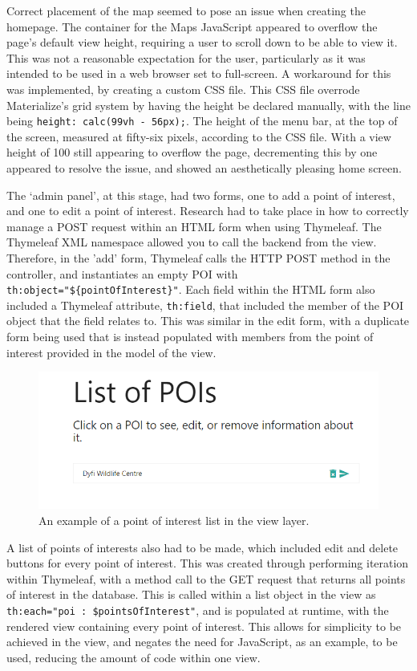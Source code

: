 Correct placement of the map seemed to pose an issue when creating the homepage. The container for the Maps JavaScript appeared to overflow the page's default view height, requiring a user to scroll down to be able to view it. This was not a reasonable expectation for the user, particularly as it was intended to be used in a web browser set to full-screen. A workaround for this was implemented, by creating a custom CSS file. This CSS file overrode Materialize's grid system by having the height be declared manually, with the line being \texttt{height: calc(99vh - 56px);}. The height of the menu bar, at the top of the screen, measured at fifty-six pixels, according to the CSS file. With a view height of 100 still appearing to overflow the page, decrementing this by one appeared to resolve the issue, and showed an aesthetically pleasing home screen.

The `admin panel', at this stage, had two forms, one to add a point of interest, and one to edit a point of interest. Research had to take place in how to correctly manage a POST request within an HTML form when using Thymeleaf. The Thymeleaf XML namespace allowed you to call the backend from the view. Therefore, in the 'add' form, Thymeleaf calls the HTTP POST method in the controller, and instantiates an empty POI with \texttt{th:object="\$\{pointOfInterest\}"}. Each field within the HTML form also included a Thymeleaf attribute, \texttt{th:field}, that included the member of the POI object that the field relates to. This was similar in the edit form, with a duplicate form being used that is instead populated with members from the point of interest provided in the model of the view.
\newpage
\begin{figure}[!ht]
	\includegraphics[scale=0.6]{diagrams/listPOI}
	\caption{An example of a point of interest list in the view layer.}
\end{figure}	


A list of points of interests also had to be made, which included edit and delete buttons for every point of interest. This was created through performing iteration within Thymeleaf, with a method call to the GET request that returns all points of interest in the database. This is called within a list object in the view as \texttt{th:each="poi : \${pointsOfInterest}"}, and is populated at runtime, with the rendered view containing every point of interest. This allows for simplicity to be achieved in the view, and negates the need for JavaScript, as an example, to be used, reducing the amount of code within one view.

